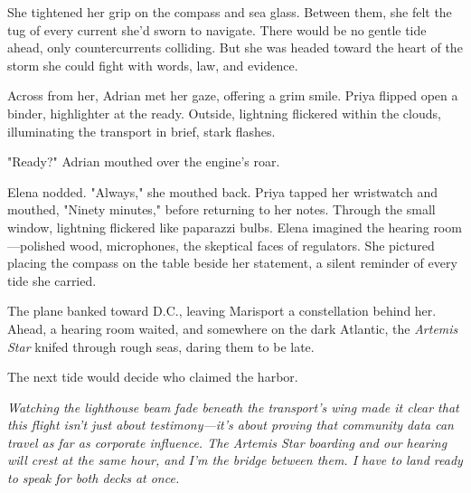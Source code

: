 She tightened her grip on the compass and sea glass. Between them, she felt the tug of every current she'd sworn to navigate. There would be no gentle tide ahead, only countercurrents colliding. But she was headed toward the heart of the storm she could fight with words, law, and evidence.

Across from her, Adrian met her gaze, offering a grim smile. Priya flipped open a binder, highlighter at the ready. Outside, lightning flickered within the clouds, illuminating the transport in brief, stark flashes.

"Ready?" Adrian mouthed over the engine's roar.

Elena nodded. "Always," she mouthed back. Priya tapped her wristwatch and mouthed, "Ninety minutes," before returning to her notes. Through the small window, lightning flickered like paparazzi bulbs. Elena imagined the hearing room—polished wood, microphones, the skeptical faces of regulators. She pictured placing the compass on the table beside her statement, a silent reminder of every tide she carried.

The plane banked toward D.C., leaving Marisport a constellation behind her. Ahead, a hearing room waited, and somewhere on the dark Atlantic, the \textit{Artemis Star} knifed through rough seas, daring them to be late.

The next tide would decide who claimed the harbor.

\noindent\textit{Watching the lighthouse beam fade beneath the transport's wing made it clear that this flight isn't just about testimony—it's about proving that community data can travel as far as corporate influence. The \textit{Artemis Star} boarding and our hearing will crest at the same hour, and I'm the bridge between them. I have to land ready to speak for both decks at once.}
